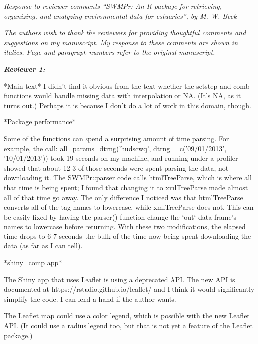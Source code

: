 \documentclass[letterpaper,12pt]{article}\usepackage[]{graphicx}\usepackage[]{color}
\newcommand{\Bigtxt}[1]{\textbf{\textit{#1}}}
\begin{document}
\raggedright


{\it Response to reviewer comments ``SWMPr: An R package for retrieving, organizing, and analyzing environmental data for estuaries'', by M. W. Beck}

{\it The authors wish to thank the reviewers for providing thoughtful comments and suggestions on my manuscript.  My response to these comments are shown in italics.  Page and paragraph numbers refer to the original manuscript.}

\Bigtxt{Reviewer 1:}

*Main text*
I didn't find it obvious from the text whether the setstep and comb functions would handle missing data with interpolation or NA. (It's NA, as it turns out.) Perhaps it is because I don't do a lot of work in this domain, though.

*Package performance*

Some of the functions can spend a surprising amount of time parsing. For example, the call: all\_params\_dtrng('hudscwq', dtrng = c('09/01/2013', '10/01/2013')) took 19 seconds on my machine, and running under a profiler showed that about 12-3 of those seconds were spent parsing the data, not downloading it. The SWMPr::parser code calls htmlTreeParse, which is where all that time is being spent; I found that changing it to xmlTreeParse made almost all of that time go away. The only difference I noticed was that htmlTreeParse converts all of the tag names to lowercase, while xmlTreeParse does not. This can be easily fixed by having the parser() function change the `out` data frame's names to lowercase before returning. With these two modifications, the elapsed time drops to 6-7 seconds--the bulk of the time now being spent downloading the data (as far as I can tell).

*shiny\_comp app*

The Shiny app that uses Leaflet is using a deprecated API. The new API is documented at https://rstudio.github.io/leaflet/ and I think it would significantly simplify the code. I can lend a hand if the author wants.

The Leaflet map could use a color legend, which is possible with the new Leaflet API. (It could use a radius legend too, but that is not yet a feature of the Leaflet package.)
\end{document}
